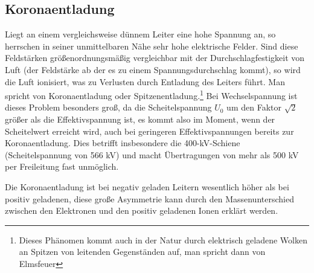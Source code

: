 \subsection{Koronaentladung}
Liegt an einem vergleichsweise dünnem Leiter eine hohe Spannung an, so herrschen in seiner unmittelbaren Nähe sehr hohe elektrische Felder.
Sind diese Feldstärken größenordnungsmäßig vergleichbar mit der Durchschlagfestigkeit von Luft (der Feldstärke ab der es zu einem Spannungsdurchschlag kommt), so wird die Luft ionisiert, was zu Verlusten durch Entladung des Leiters führt.\cite{BergmannSchaefer}
Man spricht von Koronaentladung oder Spitzenentladung.\footnote{Dieses Phänomen kommt auch in der Natur durch elektrisch geladene Wolken an Spitzen von leitenden Gegenständen auf, man spricht dann von Elmsfeuer\cite{BergmannSchaefer}}
Bei Wechselspannung ist dieses Problem besonders groß, da die Scheitelspannung $U_0$ um den Faktor $\sqrt{2}$ größer als die Effektivspannung ist, es kommt also im Moment, wenn der Scheitelwert erreicht wird, auch bei geringeren Effektivspannungen bereits zur Koronaentladung.
Dies betrifft insbesondere die 400-kV-Schiene (Scheitelspannung von 566 kV) und macht Übertragungen von mehr als 500 kV per Freileitung fast unmöglich.%

Die Koronaentladung ist bei negativ geladen Leitern wesentlich höher als bei positiv geladenen\cite{Padiyar}, diese große Asymmetrie kann durch den Massenunterschied zwischen den Elektronen und den positiv geladenen Ionen erklärt werden. %
